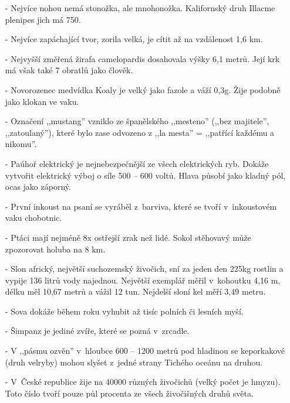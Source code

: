 \begin{multicols}{2}
\begin{itemize}
\item[-] Nejvíce nohou nemá stonožka, ale mnohonožka. Kalifornský 
druh Illacme plenipes jich má 750.

\item[-] Nejvíce zapáchající tvor, zorila velká, je cítit až na vzdálenost 
1,6 km.

\item[-] Nejvyšší změřená žirafa camelopardis dosahovala výšky 6,1 metrů. 
Její krk má však také 7 obratlů jako člověk.

\item[-] Novorozenec medvídka Koaly je velký jako fazole a váží 0,3g. 
Žije podobně jako klokan ve vaku.

\item[-] Označení ,,mustang'' vzniklo ze španělského ,,mesteno'' (,,bez 
majitele'', ,,zatoulaný''), které bylo zase odvozeno z ,,la mesta'' 
= ,,patřící každému a nikomu''.

\item[-] Paúhoř elektrický je nejnebezpečnější ze všech elektrických ryb. 
Dokáže vytvořit elektrický výboj o síle 500 -- 600 voltů. Hlava 
působí jako kladný pól, ocas jako záporný.

\item[-] První inkoust na psaní se vyráběl z~barviva, které se 
tvoří v~inkoustovém vaku chobotnic.

\item[-] Ptáci mají nejméně 8x ostřejší zrak než lidé. Sokol stěhovavý 
může zpozorovat holuba na 8 km.

\item[-] Slon africký, největší suchozemský živočich, sní za jeden den 
225kg rostlin a vypije 136 litrů vody najednou. Největší exemplář 
měřil v~kohoutku 4,16 m, délku měl 10,67 metrů a vážil 
12 tun. Nejdelší sloní kel měří 3,49 metru.

\item[-] Sova dokáže během roku vyhubit až tisíc polních či lesních myší.

\item[-] Šimpanz je jediné zvíře, které se pozná v~zrcadle.

\item[-] V ,,pásmu ozvěn'' v~hloubce 600 -- 1200 metrů pod hladinou 
se keporkakové (druh velryby) mohou slyšet z~jedné strany 
Tichého oceánu na druhou.

\item[-] V~České republice žije na 40000 různých živočichů (velký 
počet je hmyzu). Toto číslo tvoří pouze půl procenta ze všech 
živočišných druhů světa.


\end{itemize}
\end{multicols}
